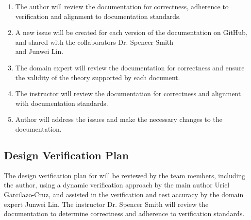 \documentclass[12pt, titlepage]{article}
\begin{document}
\begin{enumerate}
  \item The author will review the documentation for correctness, adherence to verification and alignment to documentation standards.
  \item A new issue will be created for each version of the documentation on GitHub, and shared with the collaborators Dr. Spencer Smith \\
   and Junwei Lin.
  \item The domain expert will review the documentation for correctness and ensure the validity of the theory supported by each document.
  \item The instructor will review the documentation for correctness and alignment with documentation standards.
  \item Author will address the issues and make the necessary changes to the documentation.
\end{enumerate}




\subsection{Design Verification Plan}

The design verification plan for \progname{} will be reviewed by the team members, including the author,
using a dynamic verification approach by the main author Uriel Garcilazo-Cruz, and assisted in the 
verification and test accuracy by the domain expert Junwei Lin. The instructor Dr. Spencer Smith will 
review the documentation to determine correctness and adherence to verification standards.


\end{document}
